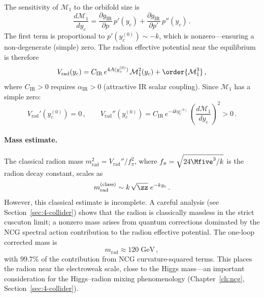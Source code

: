 The sensitivity of $\mathcal{M}_1$ to the orbifold size is
\begin{equation}
\label{eq:1-sensitivity}
\frac{d\mathcal{M}_1}{dy_c} = \frac{\partial g_{\mathrm{IR}}}{\partial p}\, p'(y_c) + \frac{\partial g_{\mathrm{IR}}}{\partial p'}\, p''(y_c)\,.
\end{equation}
The first term is proportional to $p'(y_c^{(0)}) \sim -k$, which is nonzero---ensuring a non-degenerate (simple) zero. The radion effective potential near the equilibrium is therefore
\begin{equation}
\label{eq:1-vrad}
V_{\mathrm{rad}}(y_c) = C_{\mathrm{IR}}\, e^{4A(y_c^{(0)})}\, \mathcal{M}_1^2(y_c) + \order{\mathcal{M}_1^3}\,,
\end{equation}
where $C_{\mathrm{IR}} > 0$ requires $\alpha_{\mathrm{IR}} > 0$ (attractive IR scalar coupling). Since $\mathcal{M}_1$ has a simple zero:
\begin{equation}
\label{eq:1-vrad-stable}
V_{\mathrm{rad}}'(y_c^{(0)}) = 0\,, \qquad V_{\mathrm{rad}}''(y_c^{(0)}) = C_{\mathrm{IR}}\, e^{-4ky_c^{(0)}}\, \left(\frac{d\mathcal{M}_1}{dy_c}\right)^{\!2} > 0\,.
\end{equation}

\paragraph{Mass estimate.} The classical radion mass $m_{\mathrm{rad}}^2 = V_{\mathrm{rad}}'' / f_\pi^2$, where $f_\pi = \sqrt{24\Mfive^3/k}$ is the radion decay constant, scales as
\begin{equation}
\label{eq:1-radion-mass-classical}
m_{\mathrm{rad}}^{(\mathrm{class})} \sim k\,\sqrt{\zz}\; e^{-ky_c}\,.
\end{equation}
However, this classical estimate is incomplete. A careful analysis (see Section~\ref{sec:4-collider}) shows that the radion is classically massless in the strict cuscuton limit; a nonzero mass arises from quantum corrections dominated by the NCG spectral action contribution to the radion effective potential. The one-loop corrected mass is
\begin{equation}
\label{eq:1-radion-mass-quantum}
m_{\mathrm{rad}} \approx 120\;\mathrm{GeV}\,,
\end{equation}
with $99.7\%$ of the contribution from NCG curvature-squared terms. This places the radion near the electroweak scale, close to the Higgs mass---an important consideration for the Higgs--radion mixing phenomenology (Chapter~\ref{ch:ncg}, Section~\ref{sec:4-collider}).

